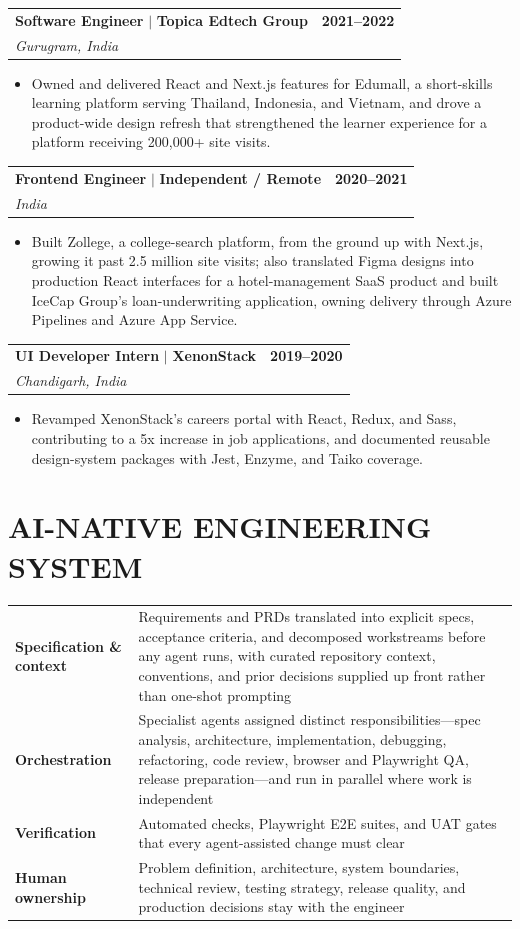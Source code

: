 \documentclass[10pt,a4paper]{article}
\makeatletter
\newcommand{\lbl}[1]{\textbf{\textcolor{ink}{#1}}}
\newcommand{\rowgap}{\noalign{\vskip 4.5pt}}
\newcommand{\role}[4]{%
  \Needspace*{5\baselineskip}%
  \begin{tabularx}{\textwidth}{@{}Xr@{}}
    \textbf{\color{ink}#1} $\mid$ \textbf{#2} & \textbf{#3} \\
    \textit{#4} &
  \end{tabularx}\vspace{-4pt}
}
\makeatother
\begin{document}
\role{Software Engineer}{Topica Edtech Group}{2021--2022}{Gurugram, India}
\begin{itemize}
  \item Owned and delivered React and Next.js features for Edumall, a short-skills learning platform serving Thailand, Indonesia, and Vietnam, and drove a product-wide design refresh that strengthened the learner experience for a platform receiving 200,000+ site visits.
\end{itemize}

\role{Frontend Engineer}{Independent / Remote}{2020--2021}{India}
\begin{itemize}
  \item Built Zollege, a college-search platform, from the ground up with Next.js, growing it past 2.5 million site visits; also translated Figma designs into production React interfaces for a hotel-management SaaS product and built IceCap Group's loan-underwriting application, owning delivery through Azure Pipelines and Azure App Service.
\end{itemize}

\role{UI Developer Intern}{XenonStack}{2019--2020}{Chandigarh, India}
\begin{itemize}
  \item Revamped XenonStack's careers portal with React, Redux, and Sass, contributing to a 5x increase in job applications, and documented reusable design-system packages with Jest, Enzyme, and Taiko coverage.
\end{itemize}

\section{AI-NATIVE ENGINEERING SYSTEM}
\begin{tabularx}{\textwidth}{@{}>{\raggedright\arraybackslash}p{}X@{}}
\lbl{Specification \& context} & Requirements and PRDs translated into explicit specs, acceptance criteria, and decomposed workstreams before any agent runs, with curated repository context, conventions, and prior decisions supplied up front rather than one-shot prompting \\ \rowgap
\lbl{Orchestration} & Specialist agents assigned distinct responsibilities---spec analysis, architecture, implementation, debugging, refactoring, code review, browser and Playwright QA, release preparation---and run in parallel where work is independent \\ \rowgap
\lbl{Verification} & Automated checks, Playwright E2E suites, and UAT gates that every agent-assisted change must clear \\ \rowgap
\lbl{Human ownership} & Problem definition, architecture, system boundaries, technical review, testing strategy, release quality, and production decisions stay with the engineer
\end{tabularx}
\end{document}
